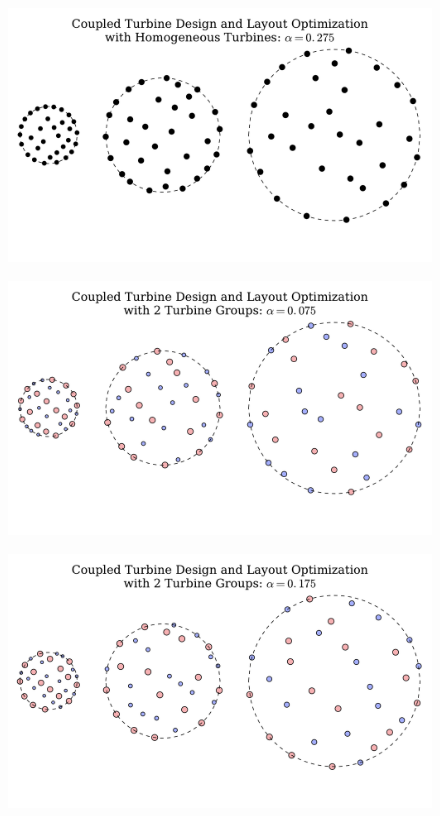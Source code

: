 \begin{figure}[htbp]
  \centering
  \includegraphics[width=\textwidth]{Figures/CircleLayoutALL1_0_275.pdf}
  \caption{\label{circ275A1}}
\end{figure}


\begin{figure}[htbp]
  \centering
  \includegraphics[width=\textwidth]{Figures/CircleLayoutALL2_0_075.pdf}
  \caption{\label{circ75A2}}
\end{figure}

\begin{figure}[htbp]
  \centering
  \includegraphics[width=\textwidth]{Figures/CircleLayoutALL2_0_175.pdf}
  \caption{\label{circ175A2}}
\end{figure}

